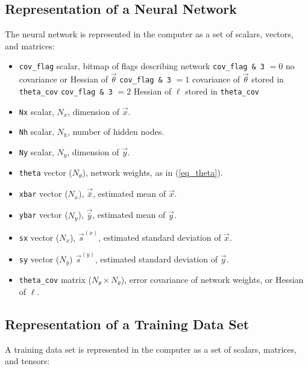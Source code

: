 \documentclass{article}    %
\begin{document}
\subsection{Representation of a Neural Network}
The neural network is represented in the computer as a set of scalars, vectors, and matrices:

\begin{itemize}
\item \verb|cov_flag| scalar, bitmap of flags describing network
  \subitem \verb|cov_flag & 3| $=0$ no covariance or Hessian of $\vec\theta$
  \subitem \verb|cov_flag & 3| $=1$ covariance of $\vec\theta$ stored in \verb|theta_cov|
  \subitem \verb|cov_flag & 3| $=2$ Hessian of $\ell$ stored in \verb|theta_cov|
\item \verb|Nx| scalar, $N_x$, dimension of $\vec{x}$.
\item \verb|Nh| scalar, $N_h$, number of hidden nodes.
\item \verb|Ny| scalar, $N_y$, dimension of $\vec{y}$.
\item \verb|theta| vector ($N_{\theta}$), network weights, as in (\ref{eq_theta}).
\item \verb|xbar| vector ($N_x$), $\vec{\bar{x}}$, estimated mean of $\vec{x}$.
\item \verb|ybar| vector ($N_y$), $\vec{\bar{y}}$, estimated mean of $\vec{y}$.
\item \verb|sx| vector ($N_x$), $\vec{s}^{(x)}$, estimated standard deviation of $\vec{x}$.
\item \verb|sy| vector ($N_y$) $\vec{s}^{(y)}$, estimated standard deviation of $\vec{y}$.
\item \verb|theta_cov| matrix ($N_{\theta} \times N_{\theta}$), error covariance of network weights, or Hessian of $\ell$.
\end{itemize}

\subsection{Representation of a Training Data Set}
A training data set is represented in the computer as a set of
scalars, matrices, and tensors:
\end{document}
